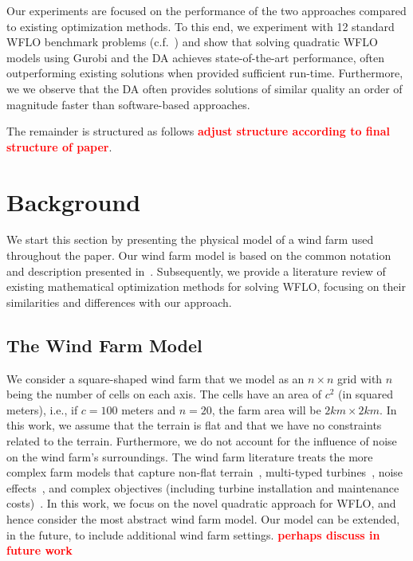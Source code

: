 \documentclass[preprint,12pt]{elsarticle}
\newcommand{\todo}[1]{{\textcolor{red}{\bf {#1}}}}
\begin{document}
Our experiments are focused on the performance of the two approaches
compared to 
existing optimization methods. To this end,
we experiment with 12 standard WFLO benchmark problems (c.f.~\cite{turner2014new})
and show that solving quadratic WFLO models
using Gurobi and the DA
achieves state-of-the-art performance, often outperforming
existing solutions when provided sufficient run-time. Furthermore, we
we observe that the DA 
often provides solutions of similar quality an order of magnitude faster
than software-based approaches.

The remainder is structured as follows \todo{adjust structure according to final structure of paper}. 


\section{Background}
\label{sec:related}

We start this section by presenting the physical model of a wind farm
used throughout the paper.  Our wind farm model is based on the common
notation and description presented in~\cite{Zhang2014}.  Subsequently,
we provide a literature review of existing mathematical optimization
methods for solving WFLO, focusing on their similarities and
differences with our approach.
 
\subsection{The Wind Farm Model}

We consider a square-shaped wind farm that we model as an $n\times n$
grid with $n$ being the number of cells on each axis.  The cells have
an area of $c^2$ (in squared meters), i.e., if $c=100$ meters and
$n=20$, the farm area will be $2km\times 2km$.  In this work, we
assume that the terrain is flat and that we have no constraints
related to the terrain.  Furthermore, we do not account for the
influence of noise on the wind farm's surroundings. The wind farm
literature treats the more complex farm models that capture non-flat
terrain~\cite{song2015lazy,kuo2016wind}, multi-typed
turbines~\cite{feng2017design}, noise
effects~\cite{Zhang2014,sorkhabi2016impact,yin2014multi}, and complex
objectives (including turbine installation and maintenance
costs)~\cite{lackner2007analytical}.  In this work, we focus on the
novel quadratic approach for WFLO, and hence consider the most
abstract wind farm model. Our model can be extended, in the
future, to include additional wind farm settings. \todo{perhaps
  discuss in future work}
 
\end{document}
